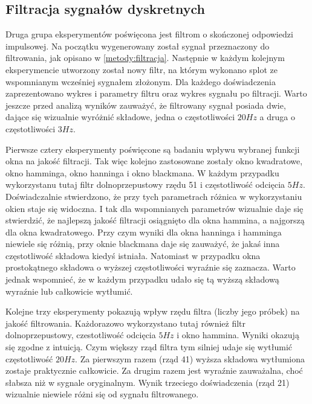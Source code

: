 \documentclass[12pt]{article}
\begin{document}
{        \subsection{Filtracja sygnałów dyskretnych} {
            Druga grupa eksperymentów poświęcona jest filtrom o skończonej odpowiedzi
            impulsowej. Na początku wygenerowany został sygnał przeznaczony do filtrowania,
            jak opisano w \ref{metody:filtracja}. Następnie w każdym kolejnym eksperymencie
            utworzony został nowy filtr, na którym wykonano splot ze wspomnianym wcześniej
            sygnałem złożonym. Dla każdego doświadczenia zaprezentowano wykres i parametry
            filtru oraz wykres sygnału po filtracji. Warto jeszcze przed analizą wyników
            zauważyć, że filtrowany sygnał posiada dwie, dające się wizualnie wyróżnić
            składowe, jedna o częstotliwości $20Hz$ a druga o częstotliwości $3Hz$.

            Pierwsze cztery eksperymenty poświęcone są badaniu wpływu wybranej funkcji
            okna na jakość filtracji. Tak więc kolejno zastosowane zostały okno
            kwadratowe, okno hamminga, okno hanninga i okno blackmana. W każdym przypadku
            wykorzystanu tutaj filtr dolnoprzepustowy rzędu 51 i częstotliwość odcięcia
            $5Hz$. Doświadczalnie stwierdzono, że przy tych parametrach różnica w
            wykorzystaniu okien staje się widoczna. I tak dla wspomnianych parametrów
            wizualnie daje się stwierdzić, że najlepszą jakość filtracji osiągnięto dla
            okna hammina, a najgorszą dla okna kwadratowego. Przy czym wyniki dla okna
            hanninga i hamminga niewiele się różnią, przy oknie blackmana daje się
            zauważyć, że jakaś inna częstotliwość składowa kiedyś istniała. Natomiast w
            przypadku okna prostokątnego składowa o wyższej częstotliwości wyraźnie się
            zaznacza. Warto jednak wspomnieć, że w każdym przypadku udało się tą wyższą
            składową wyraźnie lub całkowicie wytłumić.

            Kolejne trzy eksperymenty pokazują wpływ rzędu filtra (liczby jego próbek) na
            jakość filtrowania. Każdorazowo wykorzystano tutaj również filtr
            dolnoprzepustowy, czestotliwość odcięcia $5Hz$ i okno hammina. Wyniki okazują
            się zgodne z intuicją. Czym większy rząd filtra tym silniej udaje się wytłumić
            częstotliwość $20Hz$. Za pierwszym razem (rząd 41) wyższa składowa wytłumiona
            zostaje praktycznie całkowicie. Za drugim razem jest wyraźnie zauważalna, choć
            słabsza niż w sygnale oryginalnym. Wynik trzeciego doświadczenia (rząd 21)
            wizualnie niewiele różni się od sygnału filtrowanego.

}}
\end{document}
